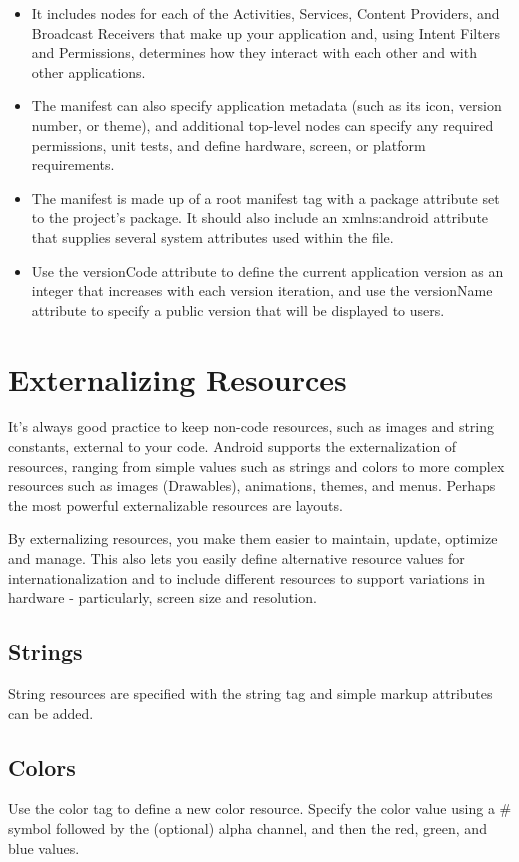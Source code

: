 \begin{itemize}
	\item It includes nodes for each of the Activities, Services, Content Providers, and Broadcast Receivers that make up your application and, using Intent Filters and Permissions, determines how they interact with each other and with other applications.
	\item The manifest can also specify application metadata (such as its icon, version number, or theme), and additional top-level nodes can specify any required permissions, unit tests, and define hardware, screen, or platform requirements.
	\item The manifest is made up of a root manifest tag with a package attribute set to the project’s package. It should also include an xmlns:android attribute that supplies several system attributes used within the file.
	\item Use the versionCode attribute to define the current application version as an integer that increases with each version iteration, and use the versionName attribute to specify a public version that will be displayed to users.
\end{itemize}

\section{Externalizing Resources}
It’s always good practice to keep non-code resources, such as images and string constants, external to your code. Android supports the externalization of resources, ranging from simple values such as strings and colors to more complex resources such as images (Drawables), animations, themes, and menus. Perhaps the most powerful externalizable resources are layouts.

By externalizing resources, you make them easier to maintain, update, optimize and manage. This also lets you easily define alternative resource values for internationalization and to include different resources to support variations in hardware - particularly, screen size and resolution.

\subsection{Strings}
String resources are specified with the string tag and simple markup attributes can be added.
\subsection{Colors}
Use the color tag to define a new color resource. Specify the color value using a \# symbol followed by the (optional) alpha channel, and then the red, green, and blue values.
